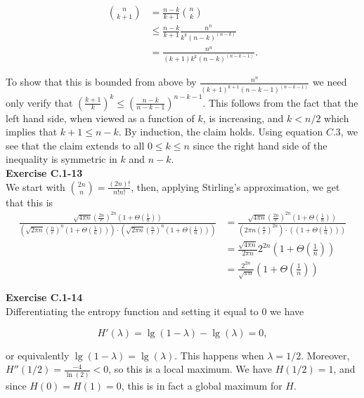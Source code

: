 \documentclass{article}
\begin{document}
\begin{align*} 
{n \choose k+1} &= \frac{n-k}{k+1} {n \choose k} \\
&\leq \frac{n-k}{k+1} \frac{n^n}{k^k(n-k)^{(n-k)}} \\
&=\frac{n^n}{(k+1)k^k(n-k)^{(n-k-1)}}.
\end{align*}

To show that this is bounded from above by $\frac{n^n}{(k+1)^{k+1}(n-k-1)^{(n-k-1)}}$ we need only verify that $\left(\frac{k+1}{k}\right)^k \leq \left(\frac{n-k}{n-k-1}\right)^{n-k-1}$.  This follows from the fact that the left hand side, when viewed as a function of $k$, is increasing, and $k < n/2$ which implies that $k+1 \leq n-k$.  By induction, the claim holds.  Using equation $C.3$, we see that the claim extends to all $0 \leq k \leq n$ since the right hand side of the inequality is symmetric in $k$ and $n-k$. \\

\noindent\textbf{Exercise C.1-13}\\

We start with $\binom{2n}{n} = \frac{(2n)!}{n!n!}$, then, applying Stirling's approximation, we get that this is
\begin{align*}
\frac{\sqrt{4\pi n}\left(\frac{2n}{e}\right)^{2n}\left(1 + \Theta\left(\frac{1}{n}\right)\right)}{\left(\sqrt{2\pi n}\left(\frac{n}{e}\right)^{n}\left(1 + \Theta\left(\frac{1}{n}\right)\right)\right)\cdot\left(\sqrt{2\pi n}\left(\frac{n}{e}\right)^{n}\left(1 + \Theta\left(\frac{1}{n}\right)\right)\right)} &= \frac{\sqrt{4\pi n}\left(\frac{2n}{e}\right)^{2n}\left(1 + \Theta\left(\frac{1}{n}\right)\right)}{\left(2\pi n\left(\frac{n}{e}\right)^{2n}\right)\cdot\left(\left(1 + \Theta\left(\frac{1}{n}\right)\right)\right)}\\
&= \frac{\sqrt{4\pi n}}{2\pi n} 2^{2n} \left(1 + \Theta\left(\frac{1}{n}\right)\right)\\
&= \frac{2^{2n}}{\sqrt{\pi n}} \left(1 + \Theta\left(\frac{1}{n}\right)\right)
\end{align*}

\noindent\textbf{Exercise C.1-14}\\

Differentiating the entropy function and setting it equal to 0 we have 

\[ H'(\lambda) = \lg(1-\lambda) - \lg(\lambda) = 0,\]

or equivalently $\lg(1-\lambda) = \lg(\lambda)$.  This happens when $\lambda = 1/2$.  Moreover, $H''(1/2) = \frac{-4}{\ln(2)} < 0$, so this is a local maximum.  We have $H(1/2) = 1$, and since $H(0) = H(1) = 0$, this is in fact a global maximum for $H$. \\
\end{document}
